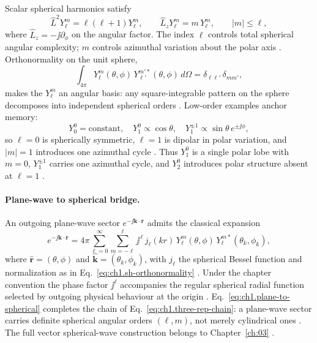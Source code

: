 Scalar spherical harmonics satisfy \cite{stratton1941,jackson1999}
\begin{equation}
\label{eq:ch1.L2-Lz-sh}
\hat L^2 Y_\ell^m=\ell(\ell+1)Y_\ell^m,\qquad
\hat L_z Y_\ell^m=m\,Y_\ell^m,\qquad |m|\le \ell,
\end{equation}
where $\hat L_z=-\jj\partial_\phi$ on the angular factor. The index $\ell$ controls total spherical angular complexity; $m$ controls azimuthal variation about the polar axis \cite{hansen1988}. Orthonormality on the unit sphere,
\begin{equation}
\label{eq:ch1.sh-orthonormality}
\int_{4\pi} Y_\ell^m(\theta,\phi)\,Y_{\ell'}^{m'*}(\theta,\phi)\,d\Omega
=\delta_{\ell\ell'}\,\delta_{mm'},
\end{equation}
makes the $Y_\ell^m$ an angular basis: any square-integrable pattern on the sphere decomposes into independent spherical orders \cite{jackson1999,stratton1941}. Low-order examples anchor memory:
\begin{equation}
\label{eq:ch1.sh-low-order}
Y_0^0=\text{constant},\quad
Y_1^0\propto\cos\theta,\quad
Y_1^{\pm1}\propto\sin\theta\,e^{\pm\jj\phi},
\end{equation}
so $\ell=0$ is spherically symmetric, $\ell=1$ is dipolar in polar variation, and $|m|=1$ introduces one azimuthal cycle \cite{stratton1941}. Thus $Y_1^0$ is a single polar lobe with $m=0$, $Y_1^{\pm1}$ carries one azimuthal cycle, and $Y_2^0$ introduces polar structure absent at $\ell=1$ \cite{stratton1941}.

\paragraph{Plane-wave to spherical bridge.}
An outgoing plane-wave sector $e^{-\jj\mathbf{k}\cdot\mathbf{r}}$ admits the classical expansion \cite{jackson1999,stratton1941}
\begin{equation}
\label{eq:ch1.plane-to-spherical}
e^{-\jj\mathbf{k}\cdot\mathbf{r}}
=
4\pi\sum_{\ell=0}^{\infty}\sum_{m=-\ell}^{\ell}
\jj^{\,\ell}\,j_\ell(kr)\,
Y_\ell^m(\theta,\phi)\,
Y_\ell^{m*}(\theta_k,\phi_k),
\end{equation}
where $\hat{\mathbf{r}}=(\theta,\phi)$ and $\hat{\mathbf{k}}=(\theta_k,\phi_k)$, with $j_\ell$ the spherical Bessel function and normalization as in Eq.~\eqref{eq:ch1.sh-orthonormality} \cite{jackson1999}. Under the chapter convention the phase factor $\jj^\ell$ accompanies the regular spherical radial function selected by outgoing physical behaviour at the origin \cite{stratton1941}. Eq.~\eqref{eq:ch1.plane-to-spherical} completes the chain of Eq.~\eqref{eq:ch1.three-rep-chain}: a plane-wave sector carries definite spherical angular orders $(\ell,m)$, not merely cylindrical ones \cite{hansen1988}. The full vector spherical-wave construction belongs to Chapter~\ref{ch:03} \cite{stratton1941}.

